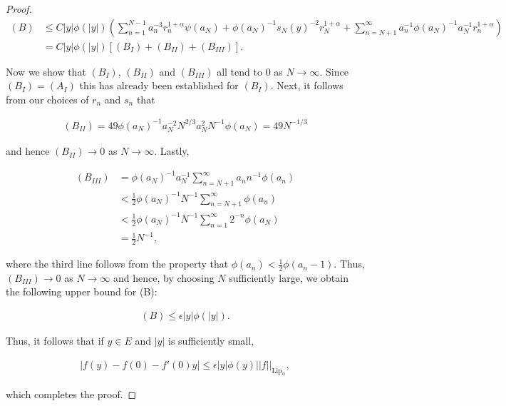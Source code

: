 \documentclass{article}
\theoremstyle{definition}
\begin{document}
\begin{proof}
\begin{align*}
    (B) &\leq C|y| \phi(|y|) \left( \sum_{n=1}^{N-1}  a_n^{-3}  r_n^{1+\alpha} \psi(a_N) + \phi(a_N)^{-1} s_N(y)^{-2} r_N^{1+\alpha} + \sum_{n=N+1}^{\infty}  a_n^{-1} \phi(a_N)^{-1} a_N^{-1}  r_n^{1+\alpha} \right)\\
    &= C|y| \phi(|y|)[(B_I) + (B_{II}) + (B_{III})].
\end{align*}

\noindent Now we show that $(B_I)$, $(B_{II})$ and $(B_{III})$ all tend to $0$ as $N \to \infty$. Since $(B_I) = (A_I)$ this has already been established for $(B_I)$. Next, it follows from our choices of $r_n$ and $s_n$ that 

\begin{align*}
    (B_{II}) = 49 \phi(a_N)^{-1} a_N^{-2} N^{2/3} a_N^2 N^{-1} \phi(a_N) = 49 N^{-1/3}
\end{align*}


\noindent and hence $(B_{II}) \to 0$ as $N \to \infty$. Lastly, 

\begin{align*}
    (B_{III}) &= \phi(a_N)^{-1} a_N^{-1}  \sum_{n=N+1}^{\infty} a_n n^{-1} \phi(a_n)\\
 &< \frac{1}{2} \phi(a_N)^{-1} N^{-1} \sum_{n=N+1}^{\infty} \phi(a_n)\\
    &< \frac{1}{2} \phi(a_N)^{-1} N^{-1} \sum_{n=1}^{\infty}2^{-n} \phi(a_N) \\
    &= \frac{1}{2} N^{-1},
\end{align*}


\noindent where the third line follows from the property that $\phi(a_n) < \frac{1}{2}\phi(a_n-1)$. Thus, $(B_{III}) \to 0$ as $N \to \infty$ and hence, by choosing $N$ sufficiently large, we obtain the following upper bound for (B):

\begin{align*}
    (B) \leq \epsilon |y| \phi(|y|).
\end{align*}



Thus, it follows that if $y \in E$ and $|y|$ is sufficiently small, 

\begin{align*}
    |f(y)-f(0) -f'(0)y| \leq \epsilon |y| \phi(y) ||f||_{\text{Lip}_{\alpha}},
\end{align*}

which completes the proof.

    
\end{proof}
\end{document}
